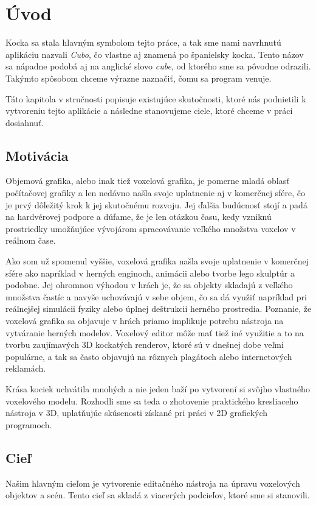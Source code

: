 \chapter{Úvod}

Kocka sa stala hlavným symbolom tejto práce, a tak sme nami navrhnutú aplikáciu nazvali \textit{Cubo}, čo vlastne aj znamená po španielsky kocka. Tento názov sa nápadne podobá aj na anglické slovo \textit{cube}, od ktorého sme sa pôvodne odrazili. Takýmto spôsobom chceme výrazne naznačiť, čomu sa program venuje.

Táto kapitola v stručnosti popisuje existujúce skutočnosti, ktoré nás podnietili k vytvoreniu tejto aplikácie a následne stanovujeme ciele, ktoré chceme v práci dosiahnuť.

\section{Motivácia}

Objemová grafika, alebo inak tiež voxelová grafika, je pomerne mladá oblasť počítačovej grafiky a len nedávno našla svoje uplatnenie aj v komerčnej sfére, čo je prvý dôležitý krok k jej skutočnému rozvoju. Jej ďalšia budúcnosť stojí a padá na hardvérovej podpore a dúfame, že je len otázkou času, kedy vzniknú prostriedky umožňujúce vývojárom spracovávanie veľkého množstva voxelov v reálnom čase.

Ako som už spomenul vyššie, voxelová grafika našla svoje uplatnenie v komerčnej sfére ako napríklad v herných enginoch, animácii alebo tvorbe lego skulptúr a podobne. Jej ohromnou výhodou v hrách je, že sa objekty skladajú z veľkého množstva častíc a navyše uchovávajú v sebe objem, čo sa dá využiť napríklad pri reálnejšej simulácii fyziky alebo úplnej deštrukcii herného prostredia. Poznanie, že voxelová grafika sa objavuje v hrách priamo implikuje potrebu nástroja na vytváranie herných modelov. Voxelový editor môže mať tiež iné využitie a to na tvorbu zaujímavých 3D kockatých renderov, ktoré sú v dnešnej dobe veľmi populárne, a tak sa často objavujú na rôznych plagátoch alebo internetových reklamách.

Krása kociek uchvátila mnohých a nie jeden baží po vytvorení si svôjho vlastného voxelového modelu. Rozhodli sme sa teda o zhotovenie praktického kresliaceho nástroja v 3D, uplatňujúc skúsenosti získané pri práci v 2D grafických programoch. 

\section{Cieľ}
Našim hlavným cieľom je vytvorenie editačného nástroja na úpravu voxelových objektov a scén. Tento cieľ sa skladá z viacerých podcieľov, ktoré sme si stanovili.

